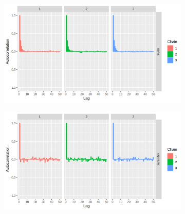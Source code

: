 \documentclass[12pt]{article}
\begin{document}
\begin{figure}[h!]
    \centering
    \begin{subfigure}{0.45\textwidth}
        \includegraphics[width=\linewidth]{pictures/centered/centautocoralpha.png}
    \end{subfigure}
    \begin{subfigure}{0.45\textwidth}
        \includegraphics[width=\linewidth]{pictures/mod2/mod2autocorr_sigmaint.png}
    \end{subfigure}


\end{figure}
\end{document}
